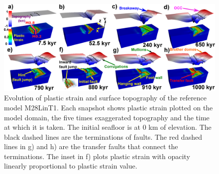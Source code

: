 \begin{figure}[h]
  \centering
    \includegraphics[width=1.0\textwidth]{./Figures/fig_Results_1_reference_model.eps}
  \caption{Evolution of plastic strain and surface topography of the reference model M28LinT1.%
  Each snapshot shows plastic strain plotted on the model domain, the five times exaggerated topography and the time at which it is taken. The initial seafloor is at 0 km of elevation. The black dashed lines are the terminations of faults. The red dashed lines in g) and h) are the transfer faults that connect the terminations. The inset in f) plots plastic strain with opacity linearly proportional to plastic strain value.}%
 \label{fig_Results1_1}
\end{figure}   

